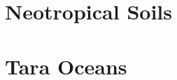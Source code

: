 
\section{Neotropical Soils}
\label{supp:sec:DetailsEmpiricalDatasets:sub:NTS}


\section{Tara Oceans}
\label{supp:sec:DetailsEmpiricalDatasets:sub:Tara}

